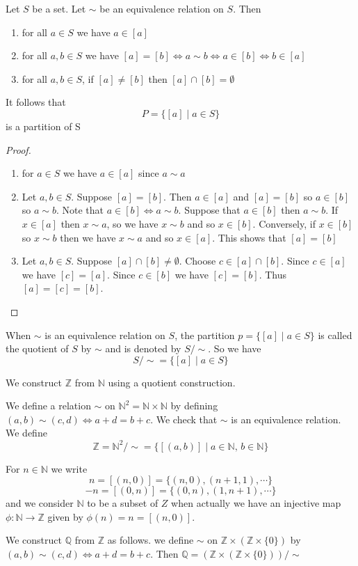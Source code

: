 \begin{thm}
Let $S$ be a set. Let $\sim $ be an equivalence relation on $S$. Then
\begin{enumerate}
\item for all $a\in S$ we have $a\in [a]$
\item for all $a,b \in S$ we have $[a]=[b] \Leftrightarrow a \sim b \Leftrightarrow a\in [b] \Leftrightarrow b\in [a]$
\item for all $a,b\in S$, if $[a] \neq [b]$ then $[a] \cap [b] = \emptyset$
\end{enumerate}

It follows that \[P = \{[a]\mid a\in S\}\] is a partition of S
\end{thm}

\begin{proof}
\begin{enumerate}
\item for $a\in S$ we have $a\in [a]$ since $a\sim a$
\item Let $a,b \in S$. Suppose $[a]=[b]$. Then $a\in [a]$ and $[a]=[b]$ so $a\in [b]$ so $a\sim b$. Note that $a\in [b] \Leftrightarrow a\sim b$. Suppose that $a\in [b]$ then $a\sim b$. If $x\in [a]$ then $x\sim a$, so we have $x\sim b$ and so $x\in [b]$. Conversely, if $x\in [b]$ so $x\sim b$ then we have $x\sim a$ and so $x\in [a]$. This shows that $[a] = [b]$
\item Let $a,b\in S$. Suppose $[a] \cap [b] \neq \emptyset$. Choose $c\in [a] \cap [b]$. Since $c\in [a]$ we have $[c] = [a]$. Since $c\in [b]$ we have $[c]=[b]$. Thus $[a]=[c]=[b]$.\qedhere
\end{enumerate}
\end{proof}

\begin{defn}[Quotient]
When $\sim$ is an equivalence relation on $S$, the partition $p = \{[a] \mid a\in S\}$ is called the quotient of $S$ by $\sim$ and is denoted by $S/\sim$. So we have \[S/\sim = \{[a] \mid a\in S\}\]
\end{defn}

\begin{exmp}
We construct $\mathbb{Z}$ from $\mathbb{N}$ using a quotient construction.

We define a relation $\sim$ on $\mathbb{N}^2 = \mathbb{N}\times\mathbb{N}$ by defining $(a,b)\sim (c,d) \Leftrightarrow a+d = b+c$. We check that $\sim$ is an equivalence relation. We define \[\mathbb{Z} = \mathbb{N}^2/\sim = \{[(a,b)] \mid a \in \mathbb{N} , \, b \in \mathbb{N}\}\]

For $n\in\mathbb{N}$ we write \[n=[(n,0)] = \{(n,0),(n+1,1),\cdots\}\] \[-n = [(0,n)] = \{(0,n),(1,n+1),\cdots\}\] and we consider $\mathbb{N}$ to be a subset of $Z$ when actually we have an injective map $\phi \colon \mathbb{N}\to \mathbb{Z}$ given by $\phi (n) = n = [(n,0)]$.
\end{exmp}

\begin{exmp}
We construct $\mathbb{Q}$ from $\mathbb{Z}$ as follows. we define $\sim$ on $\mathbb{Z}\times (\mathbb{Z}\times \{0\})$ by $(a,b)\sim (c,d) \Leftrightarrow a+d = b+c$. Then $\mathbb{Q} = (\mathbb{Z}\times (\mathbb{Z}\times \{0\}))/\sim$
\end{exmp}